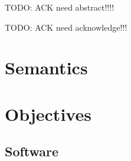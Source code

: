 \documentclass[final,12pt,twoside]{mcthesis}
\begin{document}
\sloppy
\frontmatter
{}
\thesisdate{\today}

\makepretitle
\maketitle

\newcommand{\imgsmall}{100px}
\newcommand{\imgmedsmall}{120px}
\newcommand{\imgmed}{150px}
\newcommand{\imgsmlphoto}{175px}
\newcommand{\imgmedphoto}{200px}
\newcommand{\imgmedium}{300px}

\newcommand{\emphasize}[1]{\textit{#1}}
\newcommand{\plccharts}{\emphasize{Logic Control Chart} }
\newcommand{\plcchart}{Logic Control Chart}
\newcommand{\tablefontsize}{\tiny}

\newtheorem{definition}{Definition}[section]

\setcounter{secnumdepth}{3}
\setcounter{tocdepth}{3}
{}
TODO: ACK need abstract!!!!
\newpage
{}
TODO: ACK need acknowledge!!!




\tableofcontents
\listoftables
\listoffigures

\label{pre end}
\mainmatter

\part{Semantics}





\part{Objectives}

\chapter{Software}
\label{ch:software}



\newpage
   
\end{document}
